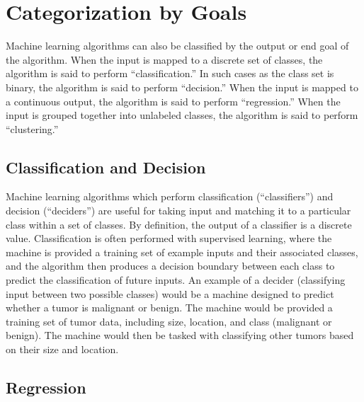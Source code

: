 
\section{Categorization by Goals} %

Machine learning algorithms can also be classified by the output or end goal of the algorithm. When the input is mapped to a discrete set of classes, the algorithm is said to perform ``classification.'' In such cases as the class set is binary, the algorithm is said to perform ``decision.'' When the input is mapped to a continuous output, the algorithm is said to perform ``regression.'' When the input is grouped together into unlabeled classes, the algorithm is said to perform ``clustering.''


\subsection{Classification and Decision} %

Machine learning algorithms which perform classification (``classifiers'') and decision (``deciders'') are useful for taking input and matching it to a particular class within a set of classes. By definition, the output of a classifier is a discrete value. Classification is often performed with supervised learning, where the machine is provided a training set of example inputs and their associated classes, and the algorithm then produces a decision boundary between each class to predict the classification of future inputs. An example of a decider (classifying input between two possible classes) would be a machine designed to predict whether a tumor is malignant or benign. The machine would be provided a training set of tumor data, including size, location, and class (malignant or benign). The machine would then be tasked with classifying other tumors based on their size and location. \cite{website:ng}


\subsection{Regression} %

